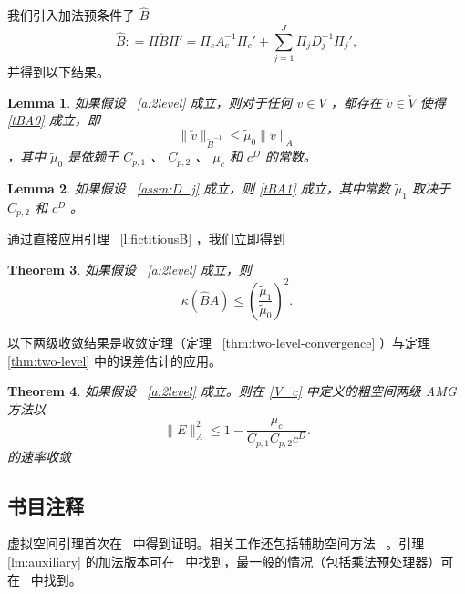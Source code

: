 \documentclass[12pt]{acta_2011xz}
\newtheorem{theorem}{Theorem}[section]
\newtheorem{lemma}[theorem]{Lemma}
\begin{document}
我们引入加法预条件子    $\widehat B$    
   \begin{equation}\label{additive_B}
    \widehat B: = \Pi \utilde B\Pi' = \Pi_cA_{c}^{-1}\Pi_c' + \sum_{j=1}^J \Pi_j D_j^{-1}\Pi_j',
\end{equation}    并得到以下结果。  

   \begin{lemma}   \label{lem:tBA0}    如果假设~    \ref{a:2level}    成立，则对于任何    $v\in V$    ，都存在    $\utilde v\in \utilde V$    使得    \eqref{tBA0}    成立，即 
   $$\|\utilde v\|_{\utilde B^{-1}}\le \tilde \mu_0\|v\|_A$$    ，其中    $\tilde \mu_0$    是依赖于    $C_{p,1}$    、    $C_{p,2}$    、    $\mu_c$    和    $c^D$    的常数。  \end{lemma}     

   \begin{lemma}   \label{lem:tBA1}    如果假设~    \ref{assm:D_j}    成立，则    \eqref{tBA1}    成立，其中常数    $\tilde \mu_1$    取决于    $C_{p,2}$    和    $c^D$    。  \end{lemma}     

通过直接应用引理~    \ref{l:fictitiousB}    ，我们立即得到
   \begin{theorem}   \label{thm:additive-converge}    如果假设~    \ref{a:2level}    成立，则 
   \begin{equation}
        \kappa (\widehat B A) \le \left(\frac{\tilde \mu_1}{\tilde \mu_0}\right)^2.
    \end{equation}     \end{theorem}     

以下两级收敛结果是收敛定理（定理~    \ref{thm:two-level-convergence}   ）与定理~    \ref{thm:two-level}    中的误差估计的应用。  

   \begin{theorem}   \label{thm:two-level-conv}    如果假设~    \ref{a:2level}    成立。则在
   \eqref{V_c}    中定义的粗空间两级 AMG 方法以
   \[
        \|E\|_A^2\le 1-\frac{\mu_c}{C_{p,1}C_{p,2}c^D}.
    \]    的速率收敛  \end{theorem}     

   \subsection{书目注释  }    虚拟空间引理首次在~    \cite{1985MatsokinA_NepomnyashchikhS-aa}    中得到证明。相关工作还包括辅助空间方法~    \cite{1996XuJ-aa}    。引理~    \ref{lm:auxiliary}    的加法版本可在~    \cite{Xu.J;Zikatanov.L.2002a}    中找到，最一般的情况（包括乘法预处理器）可在~    \cite{XuMSC-Notes}    中找到。  
\end{document}
